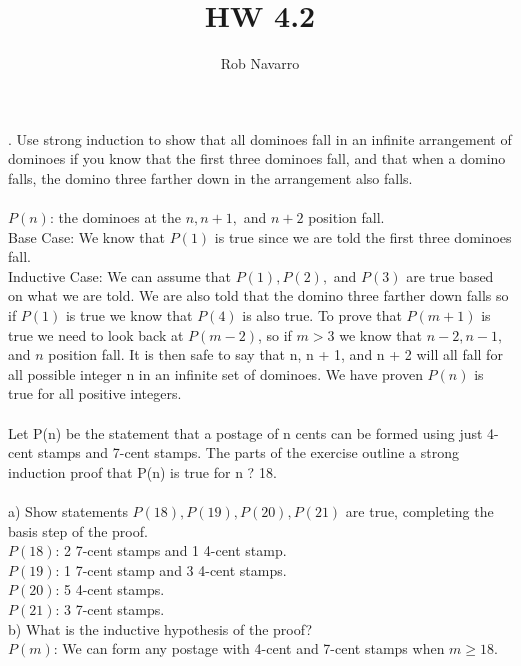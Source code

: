 \documentclass[11pt, oneside]{article}   	%
\title{HW 4.2}
\author{Rob Navarro}
\begin{document}
\maketitle
. Use strong induction to show that all dominoes fall in an infinite arrangement of dominoes if you know that the first three dominoes fall, and that when a domino falls, the domino three farther down in the arrangement also falls.\\\\
$P(n)$: the dominoes at the $n, n + 1,$ and $n + 2$ position fall. \\
Base Case: We know that $P(1)$ is true since we are told the first three dominoes fall.\\
Inductive Case: We can assume that $P(1), P(2),$ and $P(3)$ are true based on what we are told. We are also told that the domino three farther down falls so if $P(1)$ is true we know that $P(4)$ is also true. To prove that $P(m + 1)$ is true we need to look back at $P(m - 2)$, so if $m > 3$ we know that $n - 2, n - 1,$ and $n$ position fall. It is then safe to say that n, n + 1, and n + 2 will all fall for all possible integer n in an infinite set of dominoes. We have proven $P(n)$ is true for all positive integers. \\\\
Let P(n) be the statement that a postage of n cents can be formed using just 4-cent stamps and 7-cent stamps. The parts of the exercise outline a strong induction proof that P(n) is true for n ? 18.\\\\
a) Show statements $P(18), P(19), P(20), P(21)$ are true, completing the basis step of the proof.\\
$P(18)$: 2 7-cent stamps and 1 4-cent stamp.\\
$P(19)$: 1 7-cent stamp and 3 4-cent stamps.\\
$P(20)$: 5 4-cent stamps.\\
$P(21)$: 3 7-cent stamps.\\
b) What is the inductive hypothesis of the proof?\\
$P(m)$: We can form any postage with 4-cent and 7-cent stamps when $m\geq 18$. \\
\end{document}
